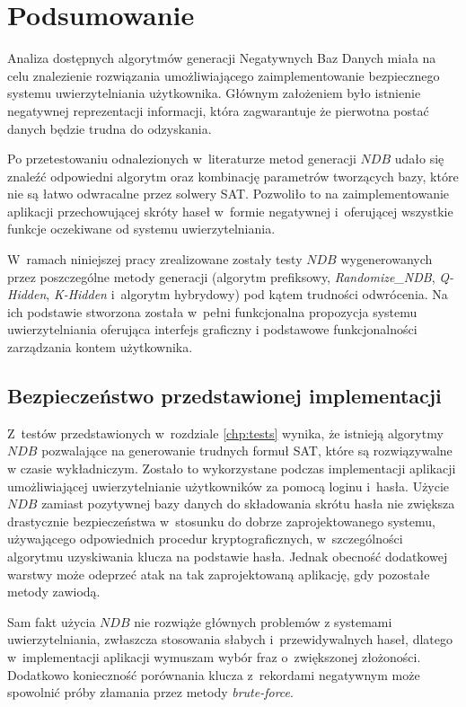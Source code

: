 \chapter{Podsumowanie}
\label{chp:conclusion}
Analiza dostępnych algorytmów generacji Negatywnych Baz Danych miała na celu znalezienie rozwiązania umożliwiającego zaimplementowanie bezpiecznego systemu uwierzytelniania użytkownika.
Głównym założeniem było istnienie negatywnej reprezentacji informacji, która zagwarantuje że pierwotna postać danych będzie trudna do odzyskania.

Po przetestowaniu odnalezionych w~literaturze metod generacji $NDB$ udało się znaleźć odpowiedni algorytm oraz kombinację parametrów tworzących bazy, które nie są łatwo odwracalne przez solwery SAT. 
Pozwoliło to na zaimplementowanie aplikacji przechowującej skróty haseł w~formie negatywnej i~oferującej wszystkie funkcje oczekiwane od systemu uwierzytelniania. 

W~ramach niniejszej pracy zrealizowane zostały testy $NDB$ wygenerowanych przez poszczególne metody generacji (algorytm prefiksowy, \textit{Randomize\_NDB}, \textit{Q-Hidden}, \textit{K-Hidden} i~algorytm hybrydowy) pod kątem trudności odwrócenia. 
Na ich podstawie stworzona została w~pełni funkcjonalna propozycja systemu uwierzytelniania oferująca interfejs graficzny i podstawowe funkcjonalności zarządzania kontem użytkownika.

\section{Bezpieczeństwo przedstawionej implementacji}
Z~testów przedstawionych w~rozdziale \ref{chp:tests} wynika, że istnieją algorytmy $NDB$ pozwalające na generowanie trudnych formuł SAT, które są rozwiązywalne w czasie wykładniczym.
Zostało to wykorzystane podczas implementacji aplikacji umożliwiającej uwierzytelnianie użytkowników za pomocą loginu i~hasła. Użycie $NDB$ zamiast pozytywnej bazy danych do składowania
skrótu hasła nie zwiększa drastycznie bezpieczeństwa w~stosunku do dobrze zaprojektowanego systemu, używającego odpowiednich procedur kryptograficznych, w~szczególności algorytmu uzyskiwania klucza
na podstawie hasła. Jednak obecność dodatkowej warstwy może odeprzeć atak na tak zaprojektowaną aplikację, gdy pozostałe metody zawiodą.

Sam fakt użycia $NDB$ nie rozwiąże głównych problemów z systemami uwierzytelniania, zwłaszcza stosowania słabych i~przewidywalnych haseł, dlatego w~implementacji aplikacji wymuszam wybór fraz o~zwiększonej złożoności.
Dodatkowo konieczność porównania klucza z~rekordami negatywnym może spowolnić próby złamania przez metody \textit{brute-force}.

